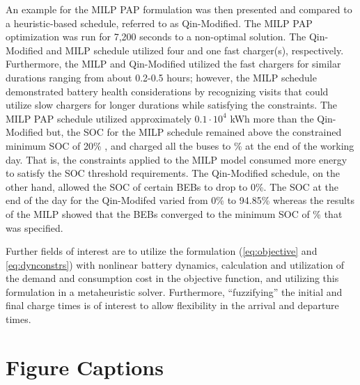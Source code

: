 \documentclass[utf8]{FrontiersinHarvard}
\newcommand{\EDIT}[1]{{\color{blue}#1}}                                         %
\newcommand{\bcharge}{0.7 }                                                     %
\newcommand{\mincharge}{20\% }                                                  %
\newcommand{\timeran}{7,200 }                                                    %
\begin{document}
An example for the MILP PAP formulation was then presented and compared to a heuristic-based schedule, referred to as
Qin-Modified. The MILP PAP optimization was run for \timeran seconds to a non-optimal solution. The Qin-Modified and
MILP schedule utilized \EDIT{four and one fast charger(s), respectively. Furthermore, the MILP and Qin-Modified utilized the fast chargers for similar durations ranging from about 0.2-0.5 hours}; however, the MILP
schedule \EDIT{demonstrated battery health considerations by recognizing visits that could utilize slow chargers for longer durations while satisfying the constraints.} The MILP PAP schedule utilized approximately
\(0.1\cdot10^4\) kWh more than the Qin-Modified \EDIT{but}, the \EDIT{SOC} for the MILP schedule remained above the
constrained minimum SOC of \mincharge, and charged all the buses to \fpeval{\bcharge *100}\% at the end of the working
day. \EDIT{That is, the constraints applied to the MILP model consumed more energy to satisfy the SOC threshold requirements.} The Qin-Modified schedule, on the other hand, allowed the SOC of certain BEBs to drop to 0\%.
\EDIT{The SOC at the end of the day for the Qin-Modifed varied from 0\% to 94.85\% whereas the results of the MILP showed that the BEBs converged to the minimum SOC of \fpeval{\bcharge * 100}\% that was specified.}

Further fields of interest are to utilize the formulation (\autoref{eq:objective} and \autoref{eq:dynconstrs}) with
nonlinear battery dynamics, calculation and utilization of the demand and consumption cost in the objective function,
and utilizing this formulation in a metaheuristic solver. Furthermore, ``fuzzifying'' the initial and final charge times
is of interest to allow flexibility in the arrival and departure times.




\nolinenumbers
\clearpage

\section{Figure Captions}
\label{sec:orgec25f84}
\end{document}
